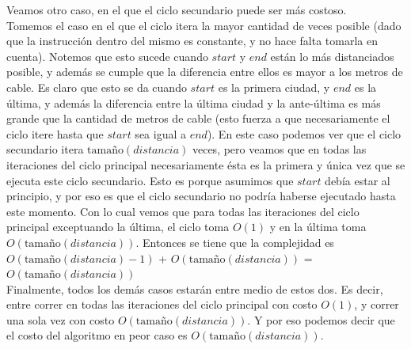 \documentclass{article}
\theoremstyle{definition}
\theoremstyle{remark}
\begin{document}
Veamos otro caso, en el que el ciclo secundario puede ser más costoso. \\
Tomemos el caso en el que el ciclo itera la mayor cantidad de veces posible (dado que la instrucción dentro del mismo es constante, y no hace falta tomarla en cuenta). Notemos que esto sucede cuando $start$ y $end$ están lo más distanciados posible, y además se cumple que la diferencia entre ellos es mayor a los metros de cable. Es claro que esto se da cuando $start$ es la primera ciudad, y $end$ es la última, y además la diferencia entre la última ciudad y la ante-última es más grande que la cantidad de metros de cable (esto fuerza a que necesariamente el ciclo itere hasta que $start$ sea igual a $end$). En este caso podemos ver que el ciclo secundario itera $\text{tamaño}(distancia)$ veces, pero veamos que en todas las iteraciones del ciclo principal necesariamente ésta es la primera y única vez que se ejecuta este ciclo secundario. Esto es porque asumimos que $start$ debía estar al principio, y por eso es que el ciclo secundario no podría haberse ejecutado hasta este momento. Con lo cual vemos que para todas las iteraciones del ciclo principal exceptuando la última, el ciclo toma $O(1)$ y en la última toma $O(\text{tamaño}(distancia))$. Entonces se tiene que la complejidad es $O(\text{tamaño}(distancia) - 1)$ + $O(\text{tamaño}(distancia))$ = $O(\text{tamaño}(distancia))$ \\
Finalmente, todos los demás casos estarán entre medio de estos dos. Es decir, entre correr en todas las iteraciones del ciclo principal con costo $O(1)$, y correr una sola vez con costo $O(\text{tamaño}(distancia))$. Y por eso podemos decir que el costo del algoritmo en peor caso es $O(\text{tamaño}(distancia))$.


\end{document}
